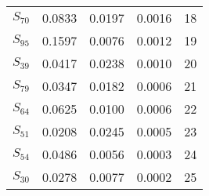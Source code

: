 \begin{xltabular}{\textwidth}{XPPPP}
  $S_{70}$ & 0.0833 & 0.0197 & 0.0016 & 18 \\ 
  $S_{95}$ & 0.1597 & 0.0076 & 0.0012 & 19 \\ 
  $S_{39}$ & 0.0417 & 0.0238 & 0.0010 & 20 \\ 
  $S_{79}$ & 0.0347 & 0.0182 & 0.0006 & 21 \\ 
  $S_{64}$ & 0.0625 & 0.0100 & 0.0006 & 22 \\ 
  $S_{51}$ & 0.0208 & 0.0245 & 0.0005 & 23 \\ 
  $S_{54}$ & 0.0486 & 0.0056 & 0.0003 & 24 \\ 
  $S_{30}$ & 0.0278 & 0.0077 & 0.0002 & 25 \\
        \bottomrule
    \end{xltabular}
    